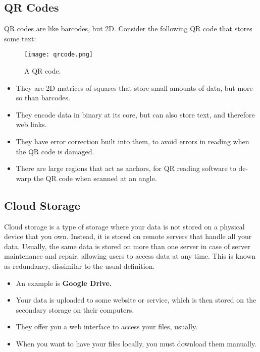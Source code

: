 \documentclass[../main.tex]{subfiles}
\begin{document}
\subsection{QR Codes}

QR codes are like barcodes, but 2D. Consider the following QR code that stores some text:

\begin{figure}[H]
    \centering
    \texttt{[image: qrcode.png]}
    \caption{A QR code.}
    \label{fig:qrcode}
\end{figure}

\begin{itemize}
    \item They are 2D matrices of squares that store small amounts of data, but more so than barcodes.
    \item They encode data in binary at its core, but can also store text, and therefore web links.
    \item They have error correction built into them, to avoid errors in reading when the QR code is damaged.
    \item There are large regions that act as anchors, for QR reading software to de-warp the QR code when scanned at an angle.
\end{itemize}

\subsection{Cloud Storage}

Cloud storage is a type of storage where your data is not stored on a physical device that you own. Instead, it is stored on remote servers that handle all your data. Usually, the same data is stored on more than one server in case of server maintenance and repair, allowing users to access data at any time. This is known as redundancy, dissimilar to the usual definition.

\begin{itemize}
    \item An example is \textbf{Google Drive.}
    \item Your data is uploaded to some website or service, which is then stored on the secondary storage on their computers.
    \item They offer you a web interface to access your files, usually.
    \item When you want to have your files locally, you must download them manually.
\end{itemize}
\end{document}
